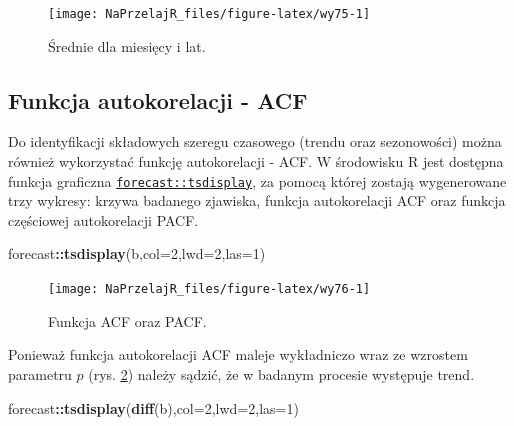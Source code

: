 \documentclass[polish,]{book}
\newenvironment{Shaded}{\begin{snugshade}}{\end{snugshade}}
\newcommand{\DataTypeTok}[1]{\textcolor[rgb]{0.13,0.29,0.53}{#1}}
\newcommand{\DecValTok}[1]{\textcolor[rgb]{0.00,0.00,0.81}{#1}}
\newcommand{\KeywordTok}[1]{\textcolor[rgb]{0.13,0.29,0.53}{\textbf{#1}}}
\newcommand{\NormalTok}[1]{#1}
\newcommand{\OperatorTok}[1]{\textcolor[rgb]{0.81,0.36,0.00}{\textbf{#1}}}
\begin{document}
\begin{figure}[h]

{\centering \texttt{[image: NaPrzelajR\_files/figure-latex/wy75-1]} 

}

\caption{Średnie dla miesięcy i lat.}\label{fig:wy75}
\end{figure}

\hypertarget{part_722}{%
\subsection{Funkcja autokorelacji - ACF}\label{part_722}}

Do identyfikacji składowych szeregu czasowego (trendu oraz sezonowości) można
również wykorzystać funkcję autokorelacji - ACF. W środowisku R jest dostępna
funkcja graficzna \href{https://rdrr.io/github/robjhyndman/forecast/man/tsdisplay.html}{\texttt{forecast::tsdisplay}}, za pomocą której zostają wygenerowane
trzy wykresy: krzywa badanego zjawiska, funkcja autokorelacji ACF oraz funkcja
częściowej autokorelacji PACF.

\begin{Shaded}
\begin{Highlighting}[]
\NormalTok{forecast}\OperatorTok{::}\KeywordTok{tsdisplay}\NormalTok{(b,}\DataTypeTok{col=}\DecValTok{2}\NormalTok{,}\DataTypeTok{lwd=}\DecValTok{2}\NormalTok{,}\DataTypeTok{las=}\DecValTok{1}\NormalTok{)}
\end{Highlighting}
\end{Shaded}

\begin{figure}[h]

{\centering \texttt{[image: NaPrzelajR\_files/figure-latex/wy76-1]} 

}

\caption{Funkcja ACF oraz PACF.}\label{fig:wy76}
\end{figure}

Ponieważ funkcja autokorelacji ACF maleje wykładniczo wraz ze wzrostem parametru \(p\) (rys. \ref{fig:wy76}) należy sądzić, że w badanym procesie występuje trend.

\begin{Shaded}
\begin{Highlighting}[]
\NormalTok{forecast}\OperatorTok{::}\KeywordTok{tsdisplay}\NormalTok{(}\KeywordTok{diff}\NormalTok{(b),}\DataTypeTok{col=}\DecValTok{2}\NormalTok{,}\DataTypeTok{lwd=}\DecValTok{2}\NormalTok{,}\DataTypeTok{las=}\DecValTok{1}\NormalTok{)}
\end{Highlighting}
\end{Shaded}
\end{document}
